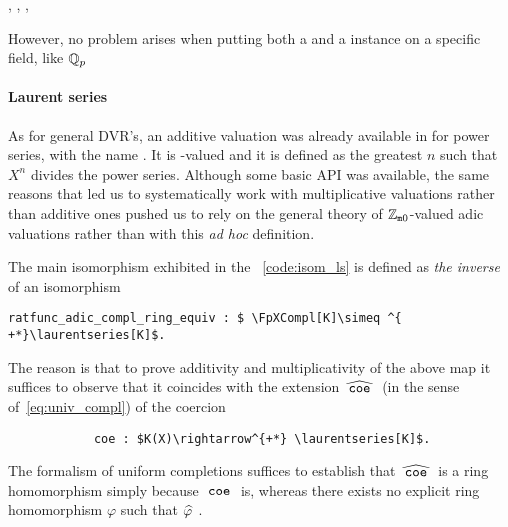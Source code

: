 \documentclass[sigplan,10pt, nonacm, review]{acmart}
\begin{document}
 , 
,  ,   

However,  no problem arises when putting both a  and a  instance on a specific field, like $\mathbb{Q}_p$


\paragraph{Laurent series}
As for general DVR's, an additive valuation was already available in \mathlib for power series, with the name \href{https://leanprover-community.github.io/mathlib_docs/ring_theory/hahn_series.html#hahn_series.add_val}{\extlink}. It is -valued and it is defined as the greatest $n$ such that $X^n$ divides the power series. Although some basic API was available, the same reasons that led us to systematically work with multiplicative valuations rather than additive ones pushed us to rely on the general theory of $\mathbb{Z}_{\mathtt{m}0}$-valued adic valuations rather than with this \emph{ad hoc} definition.

The main isomorphism  exhibited in the \LClistingname~\ref{code:isom_ls} is defined as \emph{the inverse} of an isomorphism\href{https://github.com/LCFT-Lean/local_fields/blob/76ad487d09babdb0018f394a5634526637ee014a/src/laurent_series_equiv_adic_completion.lean#L823}{\extlink}
\begin{lstlisting}
ratfunc_adic_compl_ring_equiv : $ \FpXCompl[K]\simeq ^{ +*}\laurentseries[K]$.
\end{lstlisting}
The reason is that to prove additivity and multiplicativity of the above map it suffices to observe that it coincides with the extension $\compl{\mcode{coe}}$ (in the sense of~\eqref{eq:univ_compl}) of the coercion
\begin{lstlisting}
            coe : $K(X)\rightarrow^{+*} \laurentseries[K]$.
\end{lstlisting}
The formalism of uniform completions suffices to establish that $\compl{\mcode{coe}}$ is a ring homomorphism simply because $\mathtt{\ coe\ }$ is, whereas there exists no explicit ring homomorphism $\varphi$ such that $\compl{\varphi}$ .
 
\end{document}
